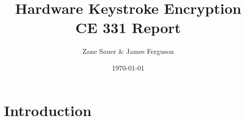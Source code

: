 \documentclass{article}
\title{Hardware Keystroke Encryption \\ CE 331 Report}
\author{Zane Sauer \&  James Ferguson}
\date{\today}
\begin{document}
\maketitle

\section{Introduction}
\end{document}
